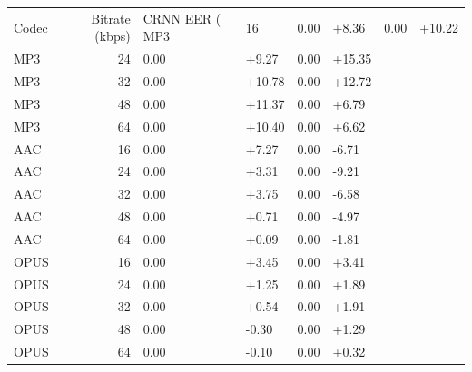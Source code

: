 \begin{tabular}{lrllll}
\toprule
Codec & Bitrate (kbps) & CRNN EER (%
\midrule
MP3 & 16 & 0.00 & +8.36 & 0.00 & +10.22 \\
MP3 & 24 & 0.00 & +9.27 & 0.00 & +15.35 \\
MP3 & 32 & 0.00 & +10.78 & 0.00 & +12.72 \\
MP3 & 48 & 0.00 & +11.37 & 0.00 & +6.79 \\
MP3 & 64 & 0.00 & +10.40 & 0.00 & +6.62 \\
AAC & 16 & 0.00 & +7.27 & 0.00 & -6.71 \\
AAC & 24 & 0.00 & +3.31 & 0.00 & -9.21 \\
AAC & 32 & 0.00 & +3.75 & 0.00 & -6.58 \\
AAC & 48 & 0.00 & +0.71 & 0.00 & -4.97 \\
AAC & 64 & 0.00 & +0.09 & 0.00 & -1.81 \\
OPUS & 16 & 0.00 & +3.45 & 0.00 & +3.41 \\
OPUS & 24 & 0.00 & +1.25 & 0.00 & +1.89 \\
OPUS & 32 & 0.00 & +0.54 & 0.00 & +1.91 \\
OPUS & 48 & 0.00 & -0.30 & 0.00 & +1.29 \\
OPUS & 64 & 0.00 & -0.10 & 0.00 & +0.32 \\
\bottomrule
\end{tabular}
